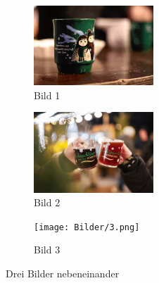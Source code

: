 \documentclass{article}
\begin{document}
    \begin{figure}[H]
        \centering
        \begin{subfigure}[b]{0.4\textwidth}
            \centering
            \includegraphics[width=4.5cm]{Bilder/1.png}
            \caption{Bild 1}
            \label{subfig:1} %
        \end{subfigure}
        \begin{subfigure}[b]{0.4\textwidth}
            \centering
            \includegraphics[width=4.5cm]{Bilder/2.png}
            \caption{Bild 2}
            \label{subfig:2}
        \end{subfigure}
        \begin{subfigure}[b]{\textwidth}
            \centering
            \texttt{[image: Bilder/3.png]}
            \caption{Bild 3}
            \label{subfig:3}
        \end{subfigure}
        \caption{Drei Bilder nebeneinander}
        \label{fig:3bilder}
    \end{figure}
\end{document}

